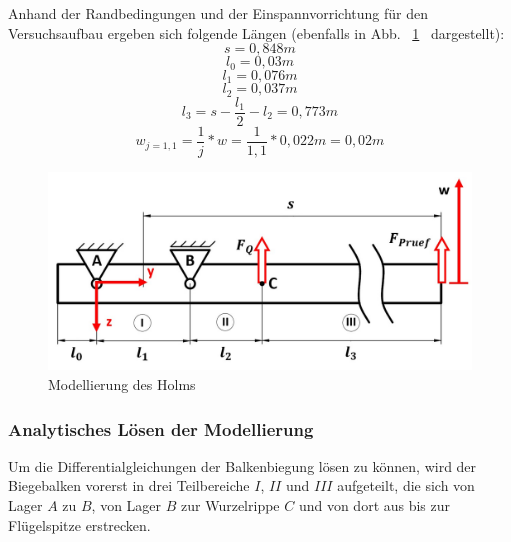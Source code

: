 \noindent Anhand der Randbedingungen und der Einspannvorrichtung für den Versuchsaufbau ergeben sich folgende Längen (ebenfalls in Abb. ~\ref{fig:Holmmodellierung}~ dargestellt): 
\begin{equation}
	s = 0,848 m
\end{equation}
\begin{equation}
	l_{0} = 0,03 m
\end{equation}
\begin{equation}
	l_{1} = 0,076 m
\end{equation}
\begin{equation}
	l_{2} = 0,037 m 
\end{equation}
\begin{equation}
	l_{3} = s - \frac{l_{1}}{2} - l_{2} = 0,773 m
\end{equation}
\begin{equation}
	w_{j=1,1} = \frac{1}{j} * w = \frac{1}{1,1} * 0,022 m = 0,02 m
\end{equation}
\begin{figure}
	\includegraphics[width=1.0\textwidth]{Bilder/Balkenmodell2.jpg}
	\caption{Modellierung des Holms}
	\label{fig:Holmmodellierung}
\end{figure}

\subsubsection{Analytisches Lösen der Modellierung}
Um die Differentialgleichungen der Balkenbiegung lösen zu können, wird der Biegebalken vorerst in drei Teilbereiche $I$, $II$ und $III$ aufgeteilt, die sich von Lager $A$ zu $B$, von Lager $B$ zur Wurzelrippe $C$ und von dort aus bis zur Flügelspitze erstrecken. \\

